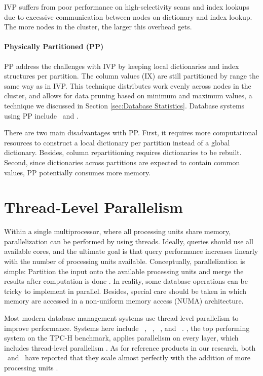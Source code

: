 IVP suffers from poor performance on high-selectivity scans and index lookups due to excessive communication between nodes on dictionary and index lookup. The more nodes in the cluster, the larger this overhead gets.

\paragraph{Physically Partitioned (PP)}
\label{par:Physically Partitioned (PP)}
PP address the challenges with IVP by keeping local dictionaries and index structures per partition. The column values (IX) are still partitioned by range the same way as in IVP. This technique distributes work evenly across nodes in the cluster, and allows for data pruning based on minimum and maximum values, a technique we discussed in Section \ref{sec:Database Statistics}. Database systems using PP include \oracle~and \saph.

There are two main disadvantages with PP. First, it requires more computational resources to construct a local dictionary per partition instead of a global dictionary. Besides, column repartitioning requires dictionaries to be rebuilt. Second, since dictionaries across partitions are expected to contain common values, PP potentially consumes more memory.

\section{Thread-Level Parallelism}
\label{sec:Thread-lever Parallelism}
Within a single multiprocessor, where all processing units share memory, parallelization can be performed by using threads. Ideally, queries should use all available cores, and the ultimate goal is that query performance increases linearly with the number of processing units available. Conceptually, parallelization is simple: Partition the input onto the available processing units and merge the results after computation is done \cite{Neumann2011-uq}. In reality, some database operations can be tricky to implement in parallel. Besides, special care should be taken in which memory are accessed in a non-uniform memory access (NUMA) architecture.

Most modern database management systems use thread-level parallelism to improve performance. Systems here include \vertica~\cite{Lamb2012-kg}, \mssql~\cite{Larson2013-mc}, \blink~\cite{Barber2012-xt, Johnson2008-cp}, and \saph~\cite{Farber2012-vh}. \exasol, the top performing system on the TPC-H benchmark, applies parallelism on every layer, which includes thread-level parallelism \cite{Exasol2014-xh}. As for reference products in our research, both \qlikview~and \tableau~have reported that they scale almost perfectly with the addition of more processing units \cite{Kamkolkar2015-iq, Qlik2011-ef}. 


